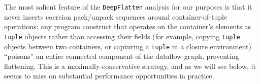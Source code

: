 The most salient feature of the \texttt{DeepFlatten} analysis for our purposes
is that it never inserts coercion pack/unpack sequences around
container-of-tuple operations: any program construct that operates on the
container's elements as \texttt{tuple} objects rather than accessing their
fields (for example, copying \texttt{tuple} objects between two containers, or
capturing a \texttt{tuple} in a closure environment) ``poisons'' an entire
connected component of the dataflow graph, preventing flattening. This is a
maximally-conservative strategy, and as we will see below, it seems to miss on
substantial performance opportunities in practice.









